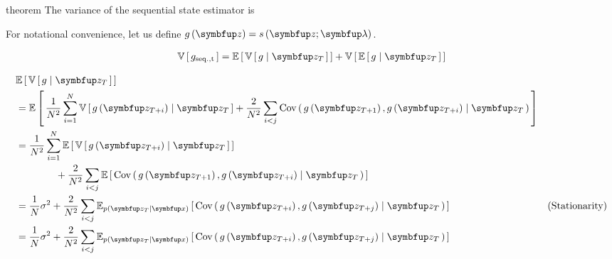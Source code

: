 
\begin{theoremEnd}{theorem}
  The variance of the sequential state estimator is
\end{theoremEnd}
\begin{proofEnd}
  For notational convenience, let us define \(g\left(\vz\right) = s\left(\vz; \vlambda\right)\).

  \begin{align}
    \V{g_{\mathrm{seq., t}}} = \E{ \V{g \mid \vz_{T}} } + \V{ \E{g \mid \vz_{T}} }
  \end{align}

  \begin{align}
    &\E{ \V{g \mid \vz_{T}} } \\
    &= \E{
      \frac{1}{N^2} \sum^{N}_{i=1} \V{ g\left(\vz_{T+i}\right) \mid \vz_{T} }
      + \frac{2}{N^2} \sum_{i<j} \Cov{g\left(\vz_{T+1}\right), g\left(\vz_{T+i}\right) \mid \vz_{T} }
    } \\
    &=
      \frac{1}{N^2} \sum^{N}_{i=1} \E{ \V{ g\left(\vz_{T+i}\right) \mid \vz_{T} }
      }\\
      &\qquad\qquad + \frac{2}{N^2} \sum_{i<j} \E{ \Cov{g\left(\vz_{T+1}\right), g\left(\vz_{T+i}\right) \mid \vz_{T} }
    } \\
    &= 
    \frac{1}{N} \sigma^2 +
    \frac{2}{N^2} \sum_{i < j}
    \Esub{p\left(\vz_T\mid\vx\right)}{
      \Cov{ g\left(\vz_{T+i}\right), g\left(\vz_{T+j}\right) \mid \vz_T}
    }  &\text{(Stationarity)} \\
    &= 
    \frac{1}{N} \sigma^2 +
    \frac{2}{N^2} \sum_{i < j}
    \Esub{p\left(\vz_T\mid\vx\right)}{
      \Cov{ g\left(\vz_{T+i}\right), g\left(\vz_{T+j}\right) \mid \vz_T}
    } 
  \end{align}
\end{proofEnd}


